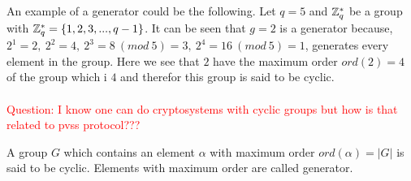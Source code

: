  An example of a generator could be the following. Let \begin{math}q=5\end{math} and \begin{math} \mathbb{Z}_q^*\end{math} be a group with \begin{math} \mathbb{Z}_q^* = \{1,2,3,...,q-1\}\end{math}. It can be seen that \begin{math} g=2\end{math} is a generator because,  \begin{math}2^1=2,\ 2^2=4,\ 2^3=8 \ (mod\ 5)=3,\ 2^4=16 \ (mod \ 5)=1 \end{math}, generates every element in the group. Here we see that $2$ have the maximum order $ord(2)=4$ of the group which i $4$ and therefor this group is said to be cyclic. \\\\
\textcolor{red}{Question: I know one can do cryptosystems with cyclic groups but how is that related to pvss protocol???}
\begin{defi}
A group $G$ which contains an element $ \alpha $ with maximum order $ord( \alpha ) = |G|$ is said to be cyclic. Elements with maximum order are called generator.
\end{defi}

